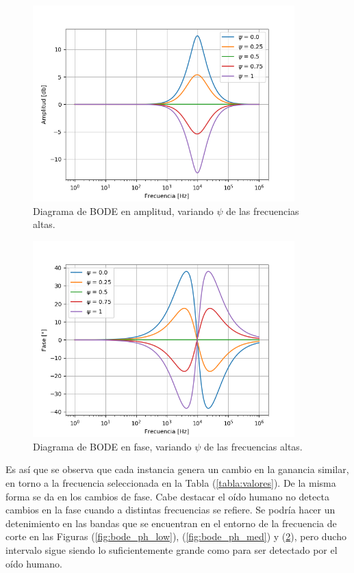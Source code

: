 \documentclass[a4paper]{article}
\begin{document}
\begin{figure}[H]
\centering
	\includegraphics[width=0.9\textwidth]{Imagenes/High-psi-bode.png}
	\caption{Diagrama de BODE en amplitud, variando $\psi$ de las frecuencias altas.}
	\label{fig:bode_modulo_high}
\end{figure}
\begin{figure}[H]
\centering
	\includegraphics[width=0.9\textwidth]{Imagenes/High-psi-ph.png}
	\caption{Diagrama de BODE en fase, variando $\psi$ de las frecuencias altas.}
	\label{fig:bode_ph_high}
\end{figure}

Es así que se observa que cada instancia genera un cambio en la ganancia similar, en torno a la frecuencia seleccionada en la Tabla (\ref{tabla:valores}). De la misma forma se da en los cambios de fase. Cabe destacar el oído humano no detecta cambios en la fase cuando a distintas frecuencias se refiere. Se podría hacer un detenimiento en las bandas que se encuentran en el entorno de la frecuencia de corte en las Figuras (\ref{fig:bode_ph_low}), (\ref{fig:bode_ph_med}) y (\ref{fig:bode_ph_high}), pero ducho intervalo sigue siendo lo suficientemente grande como para ser detectado por el oído humano.
\end{document}
